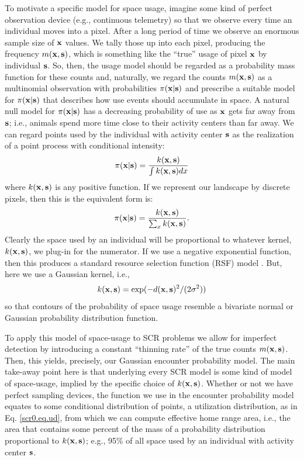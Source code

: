 To motivate a specific model for space usage, imagine some kind of
perfect observation device (e.g., continuous telemetry) so that we
observe every time an individual moves into a pixel. After a long
period of time we observe an enormous sample size of ${\bf x}$
values. We tally those up into each pixel, producing the frequency
$m({\bf x},{\bf s})$, which is something like the ``true'' usage of
pixel ${\bf x}$ by individual ${\bf s}$.  So, then, the usage model should be regarded as a probability
mass function for these counts and, naturally, we regard the counts
$m({\bf x},{\bf s})$
as a multinomial observation with probabilities $\pi({\bf x}|{\bf s})$ and
prescribe a suitable model for $\pi({\bf x}|{\bf s})$ that describes how use
events should accumulate in space. A natural null model for
$\pi({\bf x}|{\bf s})$ has a decreasing probability of use as ${\bf x}$ gets far away
from ${\bf s}$; i.e., animals spend more time close to their activity
centers than far away.
We can regard points used by the individual
with activity center ${\bf s}$ as the realization of a point process with
conditional intensity:
\[
\pi({\bf x}|{\bf s}) =  \frac{ k({\bf x},{\bf s}) }{ \int k({\bf
    x},{\bf s}) dx }
\]
where $k({\bf x},{\bf s})$ is any positive function.
If we represent our landscape by discrete pixels, then this is the
equivalent form is:
\begin{equation}
\pi({\bf x}|{\bf s}) =  \frac{ k({\bf x},{\bf s}) }{ \sum_{x} k({\bf
    x},{\bf s}) }.
\label{scr0.eq.ud}
\end{equation}
Clearly the space used by an individual will be proportional
to whatever kernel, $k({\bf x},{\bf s})$, we plug-in for the numerator.
If we use a negative exponential function, then this produces a
standard
resource selection function (RSF) model
\citep[e.g.,][Ch. 8]{manly_etal:2002}.
But, here we use a Gaussian kernel, i.e.,
\[
 k({\bf x},{\bf s})= \exp(  -d({\bf x},{\bf s})^{2}/(2\sigma^{2}))
\]
so that contours of the probability of space usage resemble a
bivariate normal or Gaussian probability distribution function.

To apply this model of space-usage to SCR problems we  allow for imperfect
detection by introducing a constant ``thinning rate'' of the true
counts $m({\bf x},{\bf s})$. Then, this
yields, precisely, our Gaussian encounter probability model.
The main take-away point here is that underlying every SCR model is
some kind of model of space-usage, implied by the
specific choice of $k({\bf x},{\bf s})$.
Whether or not we have perfect sampling devices, the function we use
in the encounter probability model equates to some conditional
distribution of points, a utilization distribution,
 as in
Eq. \ref{scr0.eq.ud}, from which we can compute effective home range
area, i.e., the area that contains some percent of the mass of a
probability distribution proportional to
 $k({\bf x},{\bf
  s})$; e.g.,  95\% of all space used by an individual with activity
center ${\bf s}$.


